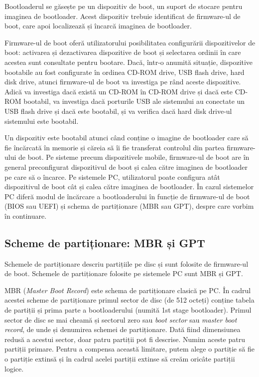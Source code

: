 Bootloaderul se găsește pe un dispozitiv de boot, un suport de stocare pentru
imaginea de bootloader. Acest dispozitiv trebuie identificat de firmware-ul de
boot, care apoi localizează și încarcă imaginea de bootloader.

Firmware-ul de boot oferă utilizatorului posibilitatea configurării dispozitivelor de boot:
activarea și dezactivarea dispozitive de boot și selectarea ordinii în care acestea sunt consultate pentru bootare.
Dacă, într-o anumită situație, dispozitive bootabile au fost configurate în ordinea
CD-ROM drive, USB flash drive, hard disk drive, atunci firmware-ul de boot va investiga pe rând aceste dispozitive.
Adică va
investiga dacă există un CD-ROM în CD-ROM drive și dacă este CD-ROM bootabil, va
investiga dacă porturile USB ale sistemului au conectate un USB flash drive și dacă
este bootabil, și va verifica dacă hard disk drive-ul sistemului este bootabil.

Un dispozitiv este bootabil atunci când conține o imagine de bootloader care să
fie încărcată în memorie și căreia să îi fie transferat controlul din partea
firmware-ului de boot. Pe sisteme precum dispozitivele mobile, firmware-ul de
boot are în general preconfigurat dispozitivul de boot și calea către imaginea
de bootloader pe care să o încarce. Pe sistemele PC, utilizatorul poate
configura atât dispozitivul de boot cât și calea către imaginea de bootloader.
În cazul sistemelor PC diferă modul de încărcare a bootloaderului în funcție de
firmware-ul de boot (BIOS sau UEFI) și schema de partiționare (MBR sau GPT),
despre care vorbim în continuare.

\subsection{Scheme de partiționare: MBR și GPT}
\label{sec:boot:bootdev:scheme}

Schemele de partiționare descriu partițiile pe disc și sunt folosite de firmware-ul de boot.
Schemele de partiționare folosite pe sistemele PC sunt MBR și GPT.

MBR (\textit{Master Boot Record}) este schema de partiționare clasică pe PC. În cadrul
acestei scheme de partiționare primul sector de disc (de 512 octeți) conține
tabela de partiții și prima parte a bootloaderului (numită 1st stage
bootloader). Primul sector de disc se mai cheamă și sectorul zero sau \textit{boot
sector} sau \textit{master boot record}, de unde și denumirea schemei de partiționare.
Dată fiind dimensiunea redusă a acestui sector, doar patru partiții pot fi
descrise. Numim aceste patru partiții primare. Pentru a compensa această
limitare, putem alege o partiție să fie o partiție extinsă și în cadrul acelei
partiții extinse să creăm oricâte partiții logice.


